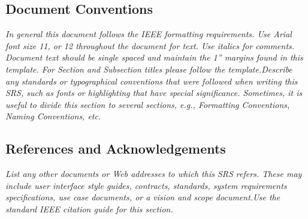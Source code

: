     \subsection{Document Conventions}
        \emph{In general this document follows the IEEE formatting requirements. Use Arial font size 11, or 12 throughout the document for text. Use italics for comments. Document text should be single spaced and maintain the 1” margins found in this template. For Section and Subsection titles please follow the template.\gnl Describe any standards or typographical conventions that were followed when writing this SRS, such as fonts or highlighting that have special significance. Sometimes, it is useful to divide this section to several sections, e.g., Formatting Conventions, Naming Conventions, etc.}
    \subsection{References and Acknowledgements}
        \emph{List any other documents or Web addresses to which this SRS refers. These may include user interface style guides, contracts, standards, system requirements specifications, use case documents, or a vision and scope document.\gnl Use the standard IEEE citation guide for this section.}
